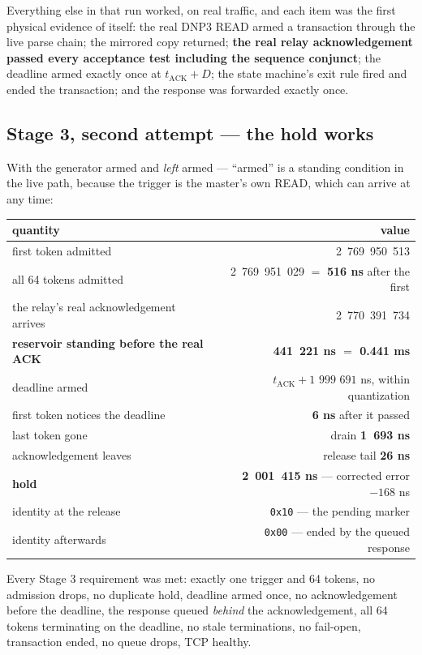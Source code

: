 \documentclass[10pt,a4paper,oneside]{article}
\newcommand{\num}[1]{\mbox{#1}}
\newcommand{\code}[1]{\texttt{\small #1}}
\begin{document}
Everything else in that run worked, on real traffic, and each item was the first physical
evidence of itself: the real DNP3 READ armed a transaction through the live parse chain; the
mirrored copy returned; \textbf{the real relay acknowledgement passed every acceptance test
including the sequence conjunct}; the deadline armed exactly once at $t_{\mathrm{ACK}}+D$;
the state machine's exit rule fired and ended the transaction; and the response was forwarded
exactly once.

\subsection{Stage 3, second attempt --- the hold works}

With the generator armed and \emph{left} armed --- ``armed'' is a standing condition in the
live path, because the trigger is the master's own READ, which can arrive at any time:

\begin{center}
\begin{tabular}{lr}
\toprule
\textbf{quantity} & \textbf{value} \\
\midrule
first token admitted & \num{2 769 950 513} \\
all 64 tokens admitted & \num{2 769 951 029} $=$ \textbf{\num{516} ns} after the first \\
the relay's real acknowledgement arrives & \num{2 770 391 734} \\
\textbf{reservoir standing before the real ACK} & \textbf{\num{441 221} ns $=$ \num{0.441} ms} \\
deadline armed & $t_{\mathrm{ACK}} + \num{1 999 691}$ ns, within quantization \\
first token notices the deadline & \textbf{6 ns} after it passed \\
last token gone & drain \textbf{\num{1 693} ns} \\
acknowledgement leaves & release tail \textbf{26 ns} \\
\textbf{hold} & \textbf{\num{2 001 415} ns} --- corrected error $-\num{168}$ ns \\
identity at the release & \code{0x10} --- the pending marker \\
identity afterwards & \code{0x00} --- ended by the queued response \\
\bottomrule
\end{tabular}
\end{center}

Every Stage 3 requirement was met: exactly one trigger and 64 tokens, no admission drops, no
duplicate hold, deadline armed once, no acknowledgement before the deadline, the response
queued \emph{behind} the acknowledgement, all 64 tokens terminating on the deadline, no
stale terminations, no fail-open, transaction ended, no queue drops, TCP healthy.
\end{document}

